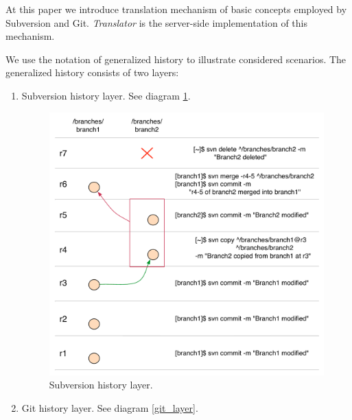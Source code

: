 At this paper we introduce translation mechanism of basic concepts employed by Subversion and Git. \emph{Translator} is the server-side implementation of this mechanism.

We use the notation of generalized history to illustrate considered scenarios. The generalized history consists of two layers:

\begin{enumerate}
	\item Subversion history layer. See diagram \ref{svn_layer}.

	\begin{figure}[!h]
	\label{svn_layer}
	\centering
	\includegraphics[width=\linewidth]{img/legend/svn_layer.pdf}
	\caption{Subversion history layer.}
	\end{figure}

	\newpage
	\item Git history layer. See diagram \ref{git_layer}.
	

\end{enumerate}

